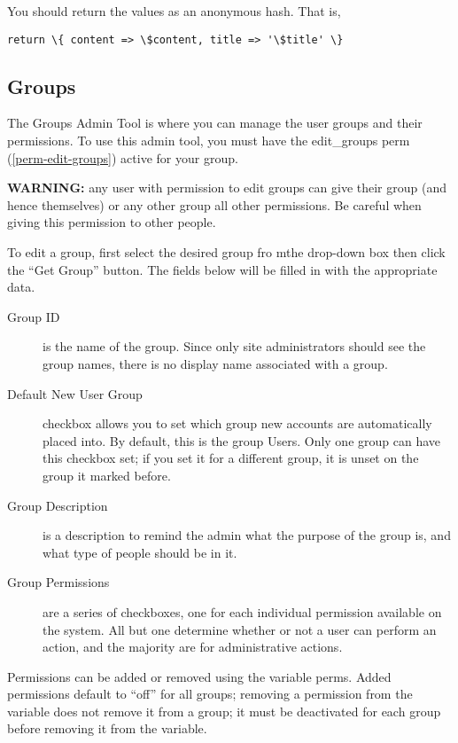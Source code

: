 You should return the values as an anonymous hash.  That is,

\begin{verbatim}
return \{ content => \$content, title => '\$title' \}
\end{verbatim}


\subsection{Groups}
\label{admin-tools-groups}

The Groups Admin Tool is where you can manage the user groups and their permissions.  To use this admin tool, you must have the edit\_groups perm (\ref{perm-edit-groups}) active for your group.

{\bf WARNING:} any user with permission to edit groups can give their group (and hence themselves) or any other group all other permissions.  Be careful when giving this permission to other people.

To edit a group, first select the desired group fro mthe drop-down box then click the ``Get Group'' button.  The fields below will be filled in with the appropriate data.

\begin{description}
\item[Group ID] is the name of the group.  Since only site administrators should see the group names, there is no display name associated with a group.
\item[Default New User Group] checkbox allows you to set which group new accounts are automatically placed into.  By default, this is the group Users.  Only one group can have this checkbox set; if you set it for a different group, it is unset on the group it marked before.
\item[Group Description] is a description to remind the admin what the purpose of the group is, and what type of people should be in it.
\item[Group Permissions] are a series of checkboxes, one for each individual permission available on the system.  All but one determine whether or not a user can perform an action, and the majority are for administrative actions.
\end{description}

Permissions can be added or removed using the variable perms.  Added permissions default to ``off'' for all groups; removing a permission from the variable does not remove it from a group; it must be deactivated for each group before removing it from the variable.

